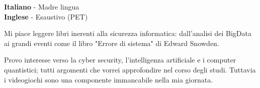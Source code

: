 \documentclass[9pt]{developercv} %
\begin{document}
\begin{minipage}[t]{0.3\textwidth}
	\vspace{-\baselineskip} %


	\textbf{Italiano} - Madre lingua\\
	\textbf{Inglese} - Esaustivo (PET)\\
\end{minipage}
\hfill
\begin{minipage}[t]{0.3\textwidth}
	\vspace{-\baselineskip} %


	Mi piace leggere libri inerenti alla sicurezza informatica: dall'analisi dei BigData ai grandi eventi come il libro "Errore di sistema" di Edward Snowden.
\end{minipage}
\hfill
\begin{minipage}[t]{0.3\textwidth}
	\vspace{-\baselineskip} %


	Provo interesse verso la cyber security, l'intelligenza artificiale e i computer quantistici; tutti argomenti che vorrei approfondire nel corso degli studi.
	Tuttavia i videogiochi sono una componente immancabile nella mia giornata.
\end{minipage}

\end{document}
